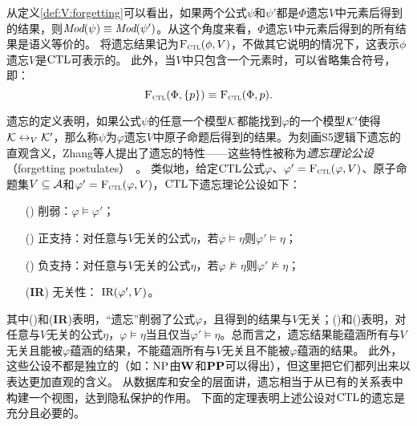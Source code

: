 从定义\ref{def:V:forgetting}可以看出，如果两个公式$\psi$和$\psi'$都是$\Phi$遗忘$V$中元素后得到的结果，则$\textit{Mod}(\psi)\equiv \textit{Mod}(\psi')$。从这个角度来看，$\Phi$遗忘$V$中元素后得到的所有结果是语义等价的。
将遗忘结果记为${\textsc{F}_{\textsc{ctl}}}(\phi,V)$，不做其它说明的情况下，这表示$\phi$遗忘$V$是$\textrm{CTL}$可表示的。
此外，当$V$中只包含一个元素时，可以省略集合符号，即：$${\textsc{F}_{\textsc{ctl}}}(\Phi, \{p\}) \equiv {\textsc{F}_{\textsc{ctl}}}(\Phi, p).$$



遗忘的定义表明，如果公式$\psi$的任意一个模型${\cal K}$都能找到$\varphi$的一个模型${\cal K}'$使得${\cal K} \leftrightarrow_V {\cal K}'$，那么称$\psi$为$\varphi$遗忘$V$中原子命题后得到的结果。为刻画S5逻辑下遗忘的直观含义，Zhang等人提出了遗忘的特性——这些特性被称为\emph{遗忘理论公设}（forgetting postulates）~\cite{Yan:AIJ:2009}。
类似地，给定$\textrm{CTL}$公式$\varphi$、$\varphi'={\textsc{F}_{\textsc{ctl}}}(\varphi, V)$、原子命题集$V\subseteq {\cal A}$和$\varphi'={\textsc{F}_{\textsc{ctl}}}(\varphi, V)$，$\textrm{CTL}$下遗忘理论公设如下：
\begin{itemize}
	\item[(\W)] 削弱：$\varphi \models \varphi'$；
	\item[(\PP)] 正支持：对任意与$V$无关的公式$\eta$，若$\varphi \models \eta$则$\varphi' \models \eta$；
	\item[(\NgP)] 负支持：对任意与$V$无关的公式$\eta$，若$\varphi \not \models \eta$则$\varphi' \not \models \eta$；
	\item[(\textbf{IR})] 无关性： $\textrm{IR}(\varphi', V)$。
\end{itemize}
其中(\W)和(\textbf{IR})表明，“遗忘”削弱了公式$\varphi$，且得到的结果与$V$无关；(\PP)和(\NgP)表明，对任意与$V$无关的公式$\eta$，$\varphi \models \eta$当且仅当$\varphi' \models \eta$。总而言之，遗忘结果能蕴涵所有与$V$无关且能被$\varphi$蕴涵的结果，不能蕴涵所有与$V$无关且不能被$\varphi$蕴涵的结果。
此外，这些公设不都是独立的（如：$\textmd{\rm NP}$由$\textbf{W}$和$\textbf{PP}$可以得出），但这里把它们都列出来以表达更加直观的含义。
从数据库和安全的层面讲，遗忘相当于从已有的关系表中构建一个视图，达到隐私保护的作用。
下面的定理表明上述公设对$\textrm{CTL}$的遗忘是充分且必要的。

